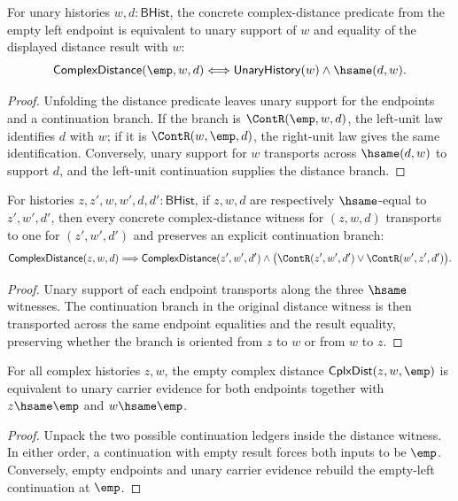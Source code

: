 \begin{theorem}
\label{thm:complex-distance-empty-left-iff}
For unary histories $w,d:\mathsf{BHist}$, the concrete complex-distance
predicate from the empty left endpoint is equivalent to unary support of $w$
and equality of the displayed distance result with $w$:
$$
\mathsf{ComplexDistance}(\emp,w,d)
\Longleftrightarrow
\mathsf{UnaryHistory}(w)\land \hsame(d,w).
$$
\end{theorem}
\begin{proof}
Unfolding the distance predicate leaves unary support for the endpoints and a
continuation branch. If the branch is $\ContR(\emp,w,d)$, the left-unit law
identifies $d$ with $w$; if it is $\ContR(w,\emp,d)$, the right-unit law gives
the same identification. Conversely, unary support for $w$ transports across
$\hsame(d,w)$ to support $d$, and the left-unit continuation supplies the
distance branch.
\end{proof}

\begin{theorem}
\label{thm:complex-distance-hsame-transport-with-relation}
For histories $z,z',w,w',d,d':\mathsf{BHist}$, if $z,w,d$ are respectively
$\hsame$-equal to $z',w',d'$, then every concrete complex-distance witness for
$(z,w,d)$ transports to one for $(z',w',d')$ and preserves an explicit
continuation branch:
$$
\mathsf{ComplexDistance}(z,w,d)
\Longrightarrow
\mathsf{ComplexDistance}(z',w',d')\land
\bigl(\ContR(z',w',d')\lor\ContR(w',z',d')\bigr).
$$
\end{theorem}
\begin{proof}
Unary support of each endpoint transports along the three $\hsame$ witnesses.
The continuation branch in the original distance witness is then transported
across the same endpoint equalities and the result equality, preserving whether
the branch is oriented from $z$ to $w$ or from $w$ to $z$.
\end{proof}

\begin{lemma}
\label{lem:cplx-distance-empty-boundary}
For all complex histories \(z,w\), the empty complex distance
\(\mathsf{CplxDist}(z,w,\emp)\) is equivalent to unary carrier evidence for
both endpoints together with \(z\hsame\emp\) and \(w\hsame\emp\).
\end{lemma}
\begin{proof}
Unpack the two possible continuation ledgers inside the distance witness. In
either order, a continuation with empty result forces both inputs to be
\(\emp\). Conversely, empty endpoints and unary carrier evidence rebuild the
empty-left continuation at \(\emp\).
\end{proof}

